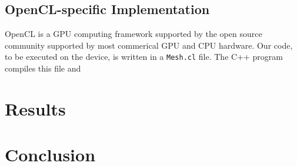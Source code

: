 \documentclass[a4paper,11pt, twocolumn]{article}
\begin{document}
\subsection{OpenCL-specific Implementation}
OpenCL is a GPU computing framework supported by the open source community supported by most commerical GPU and CPU hardware.  Our code, to be executed on the device, is written in a \verb+Mesh.cl+ file.  The C++ program compiles this file and 
\section{Results}



\section{Conclusion}


\end{document}
